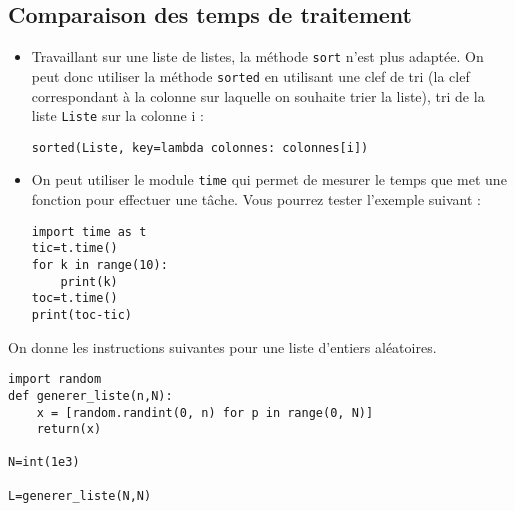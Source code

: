 \subsection{Comparaison des temps de traitement}

\begin{rem}

\begin{itemize}
\item Travaillant sur une liste de listes, la méthode \texttt{sort}  n'est plus adaptée. On peut donc utiliser la méthode \texttt{sorted} en utilisant une clef de tri (la clef correspondant à la colonne sur laquelle on souhaite trier la liste), tri de la liste \texttt{Liste} sur la colonne i :

\texttt{sorted(Liste, key=lambda colonnes: colonnes[i])}
\item On peut utiliser le module \texttt{time} qui permet de mesurer le temps que met une fonction pour effectuer une tâche. Vous pourrez tester l'exemple suivant : 
\begin{lstlisting}
import time as t
tic=t.time()
for k in range(10):
	print(k)
toc=t.time()
print(toc-tic)
\end{lstlisting}
\end{itemize}



\end{rem}






On donne les instructions suivantes pour une liste d'entiers aléatoires.


\begin{lstlisting}
import random
def generer_liste(n,N):
    x = [random.randint(0, n) for p in range(0, N)]
    return(x)

N=int(1e3)

L=generer_liste(N,N)
\end{lstlisting}



